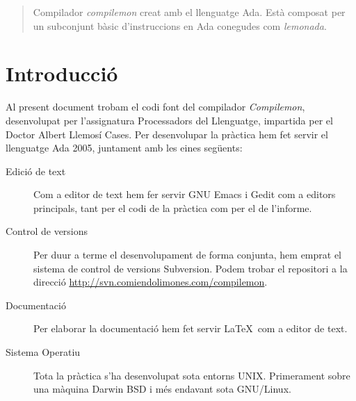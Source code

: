 


\tableofcontents
\newpage

\begin{abstract}
Compilador \emph{compilemon} creat amb el llenguatge Ada. Està
composat per un subconjunt bàsic d'instruccions en Ada conegudes
com \emph{lemonada}.
\end{abstract}

\thispagestyle{empty}

\section{Introducció}
Al present document trobam el codi font del compilador \emph{Compilemon},
desenvolupat per l'assignatura Processadors del Llenguatge, impartida per el
Doctor Albert Llemosí Cases. Per desenvolupar la pràctica hem fet servir el
llenguatge Ada 2005, juntament amb les eines següents:

\begin{description}
\item [Edició de text] Com a editor de text hem fer servir GNU Emacs i Gedit com
a editors principals, tant per el codi de la pràctica com per el de l'informe.
\item [Control de versions] Per duur a terme el desenvolupament de forma
conjunta, hem emprat el sistema de control de versions Subversion. Podem trobar
el repositori a la direcció \url{http://svn.comiendolimones.com/compilemon}.
\item [Documentació] Per elaborar la documentació hem fet servir \LaTeX~com a
editor de text.
\item [Sistema Operatiu] Tota la pràctica s'ha desenvolupat sota entorns
UNIX. Primerament sobre una màquina Darwin BSD i més endavant sota GNU/Linux.
\end{description}
\newpage


\newpage

\newpage


\newpage


\newpage

\newpage

\newpage


\newpage


\newpage

\appendix



